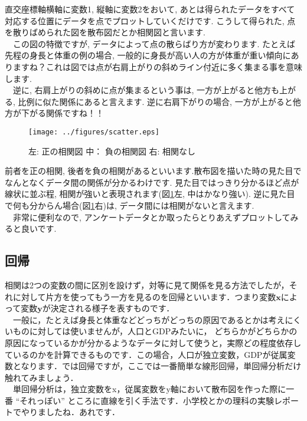 \documentclass[11pt,a4paper]{ujreport}
\begin{document}
直交座標軸横軸に変数1, 縦軸に変数2をおいて, あとは得られたデータをすべて対応する位置にデータを点でプロットしていくだけです. こうして得られた, 点を散りばめられた図を散布図だとか相関図と言います.\\
　この図の特徴ですが, データによって点の散らばり方が変わります. たとえば先程の身長と体重の例の場合, 一般的に身長が高い人の方が体重が重い傾向にありますね？これは図では点が右肩上がりの斜めライン付近に多く集まる事を意味します. \\
　逆に, 右肩上がりの斜めに点が集まるという事は, 一方が上がると他方も上がる, 比例に似た関係にあると言えます. 逆に右肩下がりの場合, 一方が上がると他方が下がる関係ですね！！\\

\begin{figure}[H]
\label{im:scatter}
  \centering
  \texttt{[image: ../figures/scatter.eps]}
  \caption{左: 正の相関図 中： 負の相関図 右: 相関なし}
\end{figure}

前者を正の相関, 後者を負の相関があるといいます.散布図を描いた時の見た目でなんとなくデータ間の関係が分かるわけです. 見た目ではっきり分かるほど点が線状に並ぶ程, 相関が強いと表現されます(図\ref{im:scatter}左, 中はかなり強い). 逆に見た目で何も分からん場合(図\ref{im:scatter}右)は, データ間には相関がないと言えます. \\
　非常に便利なので, アンケートデータとか取ったらとりあえずプロットしてみると良いです. 
\\
\subsection{回帰}
相関は2つの変数の間に区別を設けず，対等に見て関係を見る方法でしたが，それに対して片方を使ってもう一方を見るのを回帰といいます．つまり変数$\mathbf{x}$によって変数$\mathbf{y}$が決定される様子を表すものです．\\
　一般に，たとえば身長と体重などどっちがどっちの原因であるとかは考えにくいものに対しては使いませんが，人口とGDPみたいに， どちらかがどちらかの原因になっているかが分かるようなデータに対して使うと，実際どの程度依存しているのかを計算できるものです．この場合，人口が独立変数，GDPが従属変数となります．では回帰ですが，ここでは一番簡単な線形回帰，単回帰分析だけ触れてみましょう．\\

　単回帰分析は，独立変数をx，従属変数をy軸において散布図を作った際に一番 ``それっぽい'' ところに直線を引く手法です．小学校とかの理科の実験レポートでやりましたね．あれです．
\end{document}
